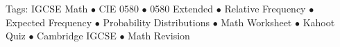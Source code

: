 \documentclass[11pt,a4paper]{article}
\begin{document}
\vspace{14pt}
\begin{center}
  \sffamily\scriptsize\textcolor{textmuted}{
    Tags: IGCSE Math $\bullet$ CIE 0580 $\bullet$ 0580 Extended $\bullet$ Relative Frequency $\bullet$ Expected Frequency $\bullet$ Probability Distributions $\bullet$ Math Worksheet $\bullet$ Kahoot Quiz $\bullet$ Cambridge IGCSE $\bullet$ Math Revision
  }
\end{center}
\end{document}

